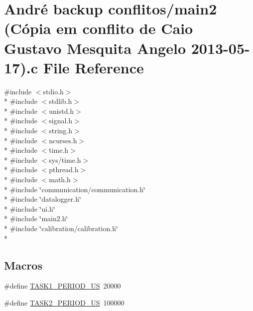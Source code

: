\hypertarget{main2_01_07C_xC3_xB3pia_01em_01conflito_01de_01Caio_01Gustavo_01Mesquita_01Angelo_012013-05-17_08_8c}{\section{André backup conflitos/main2 (Cópia em conflito de Caio Gustavo Mesquita Angelo 2013-\/05-\/17).c File Reference}
\label{main2_01_07C_xC3_xB3pia_01em_01conflito_01de_01Caio_01Gustavo_01Mesquita_01Angelo_012013-05-17_08_8c}
}
{\ttfamily \#include $<$stdio.\-h$>$}\\*
{\ttfamily \#include $<$stdlib.\-h$>$}\\*
{\ttfamily \#include $<$unistd.\-h$>$}\\*
{\ttfamily \#include $<$signal.\-h$>$}\\*
{\ttfamily \#include $<$string.\-h$>$}\\*
{\ttfamily \#include $<$ncurses.\-h$>$}\\*
{\ttfamily \#include $<$time.\-h$>$}\\*
{\ttfamily \#include $<$sys/time.\-h$>$}\\*
{\ttfamily \#include $<$pthread.\-h$>$}\\*
{\ttfamily \#include $<$math.\-h$>$}\\*
{\ttfamily \#include \char`\"{}communication/communication.\-h\char`\"{}}\\*
{\ttfamily \#include \char`\"{}datalogger.\-h\char`\"{}}\\*
{\ttfamily \#include \char`\"{}ui.\-h\char`\"{}}\\*
{\ttfamily \#include \char`\"{}main2.\-h\char`\"{}}\\*
{\ttfamily \#include \char`\"{}calibration/calibration.\-h\char`\"{}}\\*
\subsection*{Macros}
\begin{DoxyCompactItemize}
\item 
\#define \hyperlink{main2_01_07C_xC3_xB3pia_01em_01conflito_01de_01Caio_01Gustavo_01Mesquita_01Angelo_012013-05-17_08_8c_a95fe7f7d25a81aabd1194bac017074d8}{T\-A\-S\-K1\-\_\-\-P\-E\-R\-I\-O\-D\-\_\-\-U\-S}~20000
\item 
\#define \hyperlink{main2_01_07C_xC3_xB3pia_01em_01conflito_01de_01Caio_01Gustavo_01Mesquita_01Angelo_012013-05-17_08_8c_adfe9b03db41d576a3beb124ec44a54d8}{T\-A\-S\-K2\-\_\-\-P\-E\-R\-I\-O\-D\-\_\-\-U\-S}~100000
\end{DoxyCompactItemize}
